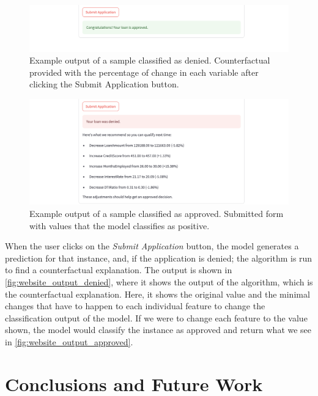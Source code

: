 \documentclass[12pt]{extarticle}
\numberwithin{equation}{section}
\begin{document}
\begin{figure}[H]
    \centering
    \includegraphics[width=1\textwidth]{images/website_output_denied}
    \caption{Example output of a sample classified as denied. Counterfactual provided with the percentage of change in each variable after clicking the Submit Application button.}
    \label{fig:website_output_denied}
\end{figure}
\begin{figure}[H]
    \centering
    \includegraphics[width=1\textwidth]{images/website_output_approved}
    \caption{Example output of a sample classified as approved. Submitted form with values that the model classifies as positive.}
    \label{fig:website_output_approved}
\end{figure}


When the user clicks on the \emph{Submit Application} button, the model generates a prediction for that instance, and, if the application is denied; the algorithm is run to find a counterfactual explanation. The output is shown in \autoref{fig:website_output_denied}, where it shows the output of the algorithm, which is the counterfactual explanation. Here, it shows the original value and the minimal changes that have to happen to each individual feature to change the classification output of the model. If we were to change each feature to the value shown, the model would classify the instance as approved and return what we see in \autoref{fig:website_output_approved}.


\section{Conclusions and Future Work}\label{sec:conclusion}
\end{document}
